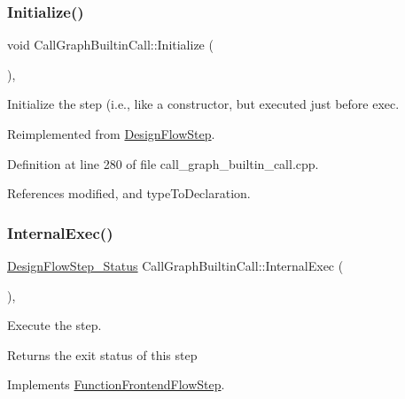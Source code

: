 \subsubsection{\texorpdfstring{Initialize()}{Initialize()}}
{\footnotesize\ttfamily void Call\+Graph\+Builtin\+Call\+::\+Initialize (\begin{DoxyParamCaption}{ }\end{DoxyParamCaption})\hspace{0.3cm}{\ttfamily [override]}, {\ttfamily [virtual]}}



Initialize the step (i.\+e., like a constructor, but executed just before exec. 



Reimplemented from \hyperlink{classDesignFlowStep_a44b50683382a094976e1d432a7784799}{Design\+Flow\+Step}.



Definition at line 280 of file call\+\_\+graph\+\_\+builtin\+\_\+call.\+cpp.



References modified, and type\+To\+Declaration.

\mbox{\label{classCallGraphBuiltinCall_a6c31ba7314cedc5026d47cb1c5b967ed}} 
\subsubsection{\texorpdfstring{Internal\+Exec()}{InternalExec()}}
{\footnotesize\ttfamily \hyperlink{design__flow__step_8hpp_afb1f0d73069c26076b8d31dbc8ebecdf}{Design\+Flow\+Step\+\_\+\+Status} Call\+Graph\+Builtin\+Call\+::\+Internal\+Exec (\begin{DoxyParamCaption}{ }\end{DoxyParamCaption})\hspace{0.3cm}{\ttfamily [override]}, {\ttfamily [virtual]}}



Execute the step. 

\begin{DoxyReturn}{Returns}
the exit status of this step 
\end{DoxyReturn}


Implements \hyperlink{classFunctionFrontendFlowStep_a00612f7fb9eabbbc8ee7e39d34e5ac68}{Function\+Frontend\+Flow\+Step}.



